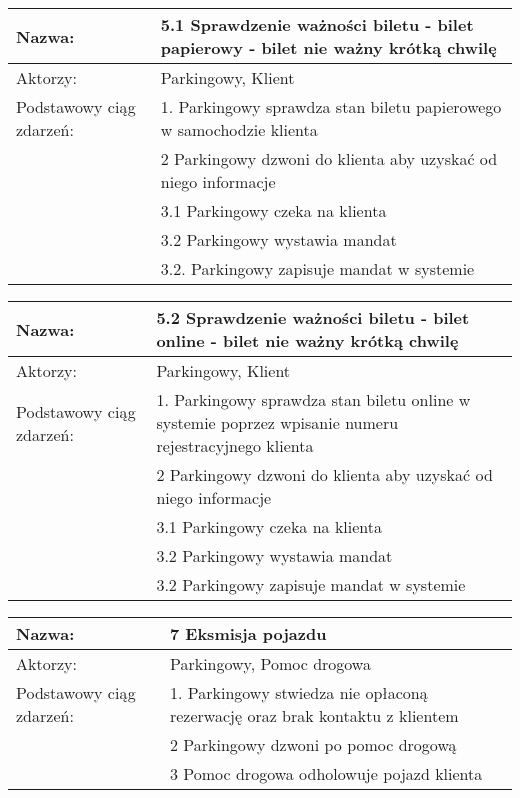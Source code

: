 \begin{center}
\vspace{1cm}

\begin{tabular}{|L{3cm}  L{13cm}|}
\hline
Nazwa: & 5.1 Sprawdzenie ważności biletu - bilet papierowy - bilet nie ważny krótką chwilę\\ \hline
Aktorzy: & Parkingowy, Klient \\ \hline
Podstawowy ciąg zdarzeń: & 1. Parkingowy sprawdza stan biletu papierowego w samochodzie klienta \\
 & 2  Parkingowy dzwoni do klienta aby uzyskać od niego informacje\\
 & 3.1 Parkingowy czeka na klienta \\
 & 3.2 Parkingowy wystawia mandat \\
 & 3.2. Parkingowy zapisuje mandat w systemie \\
 \hline
\end{tabular}

\vspace{1cm}

\begin{tabular}{|L{3cm}  L{13cm}|}
\hline
Nazwa: & 5.2 Sprawdzenie ważności biletu - bilet online - bilet nie ważny krótką chwilę\\ \hline
Aktorzy: & Parkingowy, Klient \\ \hline
Podstawowy ciąg zdarzeń: & 1. Parkingowy sprawdza stan biletu online w systemie poprzez wpisanie numeru rejestracyjnego klienta \\
 & 2  Parkingowy dzwoni do klienta aby uzyskać od niego informacje\\
 & 3.1 Parkingowy czeka na klienta \\
 & 3.2 Parkingowy wystawia mandat \\
 & 3.2 Parkingowy zapisuje mandat w systemie \\
 \hline
\end{tabular}

\vspace{1cm}

\begin{tabular}{|L{3cm}  L{13cm}|}
\hline
Nazwa: & 7 Eksmisja pojazdu\\ \hline
Aktorzy: & Parkingowy, Pomoc drogowa \\ \hline
Podstawowy ciąg zdarzeń: & 1. Parkingowy stwiedza nie opłaconą rezerwację oraz brak kontaktu z klientem\\
 & 2 Parkingowy dzwoni po pomoc drogową\\
 & 3 Pomoc drogowa odholowuje pojazd klienta \\
 \hline
\end{tabular}


\end{center}
